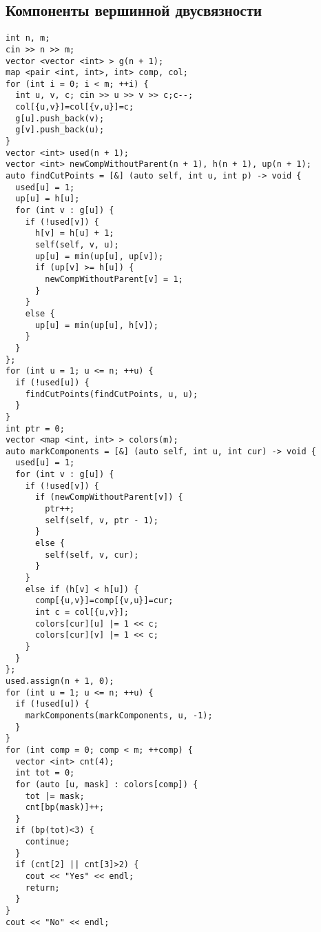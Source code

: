 \subsection{Компоненты вершинной двусвязности}
\begin{lstlisting}
int n, m;
cin >> n >> m;
vector <vector <int> > g(n + 1);
map <pair <int, int>, int> comp, col;
for (int i = 0; i < m; ++i) {
  int u, v, c; cin >> u >> v >> c;c--;
  col[{u,v}]=col[{v,u}]=c;
  g[u].push_back(v);
  g[v].push_back(u);
}
vector <int> used(n + 1);
vector <int> newCompWithoutParent(n + 1), h(n + 1), up(n + 1);
auto findCutPoints = [&] (auto self, int u, int p) -> void {
  used[u] = 1;
  up[u] = h[u];
  for (int v : g[u]) {
    if (!used[v]) {
      h[v] = h[u] + 1;
      self(self, v, u);
      up[u] = min(up[u], up[v]);
      if (up[v] >= h[u]) {
        newCompWithoutParent[v] = 1;
      }
    }
    else {
      up[u] = min(up[u], h[v]);
    }
  }
};
for (int u = 1; u <= n; ++u) {
  if (!used[u]) {
    findCutPoints(findCutPoints, u, u);
  }
}
int ptr = 0;
vector <map <int, int> > colors(m);
auto markComponents = [&] (auto self, int u, int cur) -> void {
  used[u] = 1;
  for (int v : g[u]) {
    if (!used[v]) {
      if (newCompWithoutParent[v]) {
        ptr++;
        self(self, v, ptr - 1);
      }
      else {
        self(self, v, cur);
      }
    }
    else if (h[v] < h[u]) {
      comp[{u,v}]=comp[{v,u}]=cur;
      int c = col[{u,v}];
      colors[cur][u] |= 1 << c;
      colors[cur][v] |= 1 << c;
    }
  }
};
used.assign(n + 1, 0);
for (int u = 1; u <= n; ++u) {
  if (!used[u]) {
    markComponents(markComponents, u, -1);
  }
}
for (int comp = 0; comp < m; ++comp) {
  vector <int> cnt(4);
  int tot = 0;
  for (auto [u, mask] : colors[comp]) {
    tot |= mask;
    cnt[bp(mask)]++;
  }
  if (bp(tot)<3) {
    continue;
  }
  if (cnt[2] || cnt[3]>2) {
    cout << "Yes" << endl;
    return;
  }
}
cout << "No" << endl;
\end{lstlisting}
